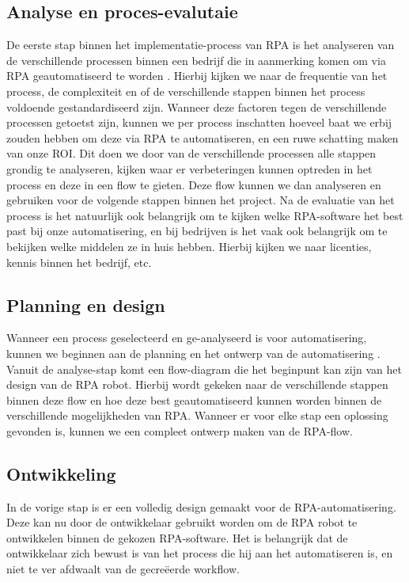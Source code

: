 \subsection{Analyse en proces-evalutaie}

De eerste stap binnen het implementatie-process van RPA is het analyseren van de verschillende processen binnen een bedrijf die in aanmerking komen om via RPA geautomatiseerd te worden \autocite{vanDerAalst2018}. Hierbij kijken we naar de frequentie van het process, de complexiteit en of de verschillende stappen binnen het process voldoende gestandardiseerd zijn. Wanneer deze factoren tegen de verschillende processen getoetst zijn, kunnen we per process inschatten hoeveel baat we erbij zouden hebben om deze via RPA te automatiseren, en een ruwe schatting maken van onze ROI. 
Dit doen we door van de verschillende processen alle stappen grondig te analyseren, kijken waar er verbeteringen kunnen optreden in het process en deze in een flow te gieten. Deze flow kunnen we dan analyseren en gebruiken voor de volgende stappen binnen het project.
Na de evaluatie van het process is het natuurlijk ook belangrijk om te kijken welke RPA-software het best past bij onze automatisering, en bij bedrijven is het vaak ook belangrijk om te bekijken welke middelen ze in huis hebben. Hierbij kijken we naar licenties, kennis binnen het bedrijf, etc.

\subsection{Planning en design}

Wanneer een process geselecteerd en ge-analyseerd is voor automatisering, kunnen we beginnen aan de planning en het ontwerp van de automatisering \autocite{Fernandez2021}. Vanuit de analyse-stap komt een flow-diagram die het beginpunt kan zijn van het design van de RPA robot. Hierbij wordt gekeken naar de verschillende stappen binnen deze flow en hoe deze best geautomatiseerd kunnen worden binnen de verschillende mogelijkheden van RPA. Wanneer er voor elke stap een oplossing gevonden is, kunnen we een compleet ontwerp maken van de RPA-flow.

\subsection{Ontwikkeling}

In de vorige stap is er een volledig design gemaakt voor de RPA-automatisering. Deze kan nu door de ontwikkelaar gebruikt worden om de RPA robot te ontwikkelen binnen de gekozen RPA-software. Het is belangrijk dat de ontwikkelaar zich bewust is van het process die hij aan het automatiseren is, en niet te ver afdwaalt van de gecreëerde workflow.

